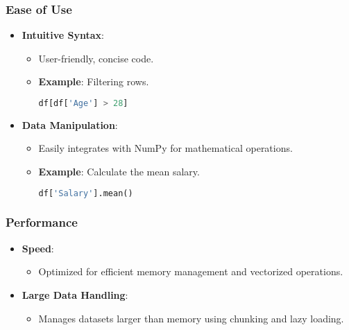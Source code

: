 \documentclass[aspectratio=169]{beamer}
\begin{document}
\begin{frame}[fragile]
    \frametitle{Ease of Use}
    \begin{itemize}
        \item \textbf{Intuitive Syntax}:
            \begin{itemize}
                \item User-friendly, concise code.
                \item \textbf{Example}: Filtering rows.
                \begin{lstlisting}[language=Python]
df[df['Age'] > 28]
                \end{lstlisting}
            \end{itemize}
        
        \item \textbf{Data Manipulation}:
            \begin{itemize}
                \item Easily integrates with NumPy for mathematical operations.
                \item \textbf{Example}: Calculate the mean salary.
                \begin{lstlisting}[language=Python]
df['Salary'].mean()
                \end{lstlisting}
            \end{itemize}
    \end{itemize}
\end{frame}

\begin{frame}
    \frametitle{Performance}
    \begin{itemize}
        \item \textbf{Speed}:
            \begin{itemize}
                \item Optimized for efficient memory management and vectorized operations.
            \end{itemize}
        
        \item \textbf{Large Data Handling}:
            \begin{itemize}
                \item Manages datasets larger than memory using chunking and lazy loading.
            \end{itemize}
    \end{itemize}
\end{frame}
\end{document}
